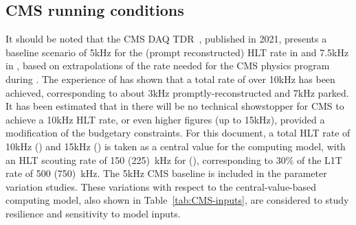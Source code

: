 \subsection{CMS running conditions}
\label{sec:cmsrunning}

It should be noted that the CMS \gls{DAQ} \gls{TDR}~\cite{CMS:2021DAQTDR}, published in 2021, presents a baseline scenario of 5\unit{kHz} for the (prompt reconstructed) \gls{HLT} rate in \RunFour and 7.5\unit{kHz} in \RunFive, based on extrapolations of the rate needed for the CMS physics program during \RunTwo. The experience of \RunThree has shown that a total rate of over 10\unit{kHz} has been achieved, corresponding to about 3\unit{kHz} promptly-reconstructed and 7\unit{kHz} parked. It has been estimated that in \RunFour there will be no technical showstopper for CMS to achieve a 10\unit{kHz} HLT rate, or even higher figures (up to 15\unit{kHz}), provided a modification of the budgetary constraints. For this document, a total \gls{HLT} rate of 10\unit{kHz} (\RunFour) and 15\unit{kHz} (\RunFive) is taken as a central value for the computing model, with an HLT scouting rate of 150 (225)~kHz for \RunFour (\RunFive), corresponding to 30\% of the \gls{L1T} rate of 500 (750)~kHz. The 5\unit{kHz} CMS baseline is included in the parameter variation studies. These variations with respect to the central-value-based computing model, also shown in Table~\ref{tab:CMS-inputs}, are considered to study resilience and sensitivity to model inputs. 

